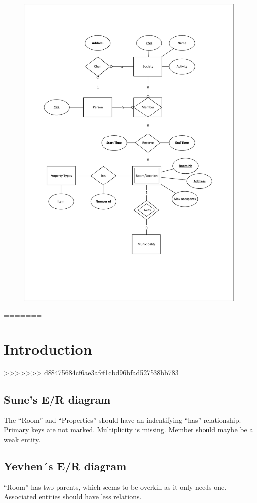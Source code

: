 \begin{figure}[h]
  \centering
  \includegraphics[]{./ER diagram 1.pdf}
\end{figure}
=======
\section{Introduction}
>>>>>>> d88475684cf6ae3afcf1cbd96bfad527538bb783

\subsection{Sune’s E/R diagram}
The ``Room'' and ``Properties'' should have an indentifying ``has'' relationship.
Primary keys are not marked. Multiplicity is missing. Member should maybe be a weak entity. 


\subsection{Yevhen´s E/R diagram}
``Room'' has two parents, which seems to be overkill as it only needs one. 
Associated entities should have less relations. 

